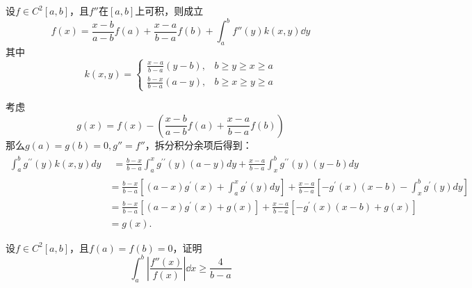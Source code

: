 \begin{theorem}[拉格朗日插值积分余项]
设$f\in C^2[a,b]$，且$f''$在$[a,b]$上可积，则成立
\[f(x)=\frac{x-b}{a-b}f(a)+\frac{x-a}{b-a}f(b)+\int_a^bf''(y)k(x,y)\dd y\]
其中\[k(x,y)=\begin{cases}\frac{x-a}{b-a}(y-b),&b\geqslant y\geqslant x\geqslant a\\\frac{b-x}{b-a}(a-y),&b\geqslant x\geqslant y\geqslant a\end{cases}\]
\end{theorem}
考虑\[g(x)=f(x)-\left(\frac{x-b}{a-b}f(a)+\frac{x-a}{b-a}f(b)\right)\]
那么$g(a)=g(b)=0,g''=f''$，拆分积分余项后得到：
\begin{align*}\int_a^bg^{\prime\prime}\left(y\right)k\left(x,y\right)dy&\begin{aligned}=\frac{b-x}{b-a}\int_{a}^{x}g^{\prime\prime}\left(y\right)\left(a-y\right)dy+\frac{x-a}{b-a}\int_{x}^{b}g^{\prime\prime}\left(y\right)\left(y-b\right)dy\end{aligned}\\&=\frac{b-x}{b-a}\left[\left(a-x\right)g^{\prime}\left(x\right)+\int_{a}^{x}g^{\prime}\left(y\right)dy\right]+\frac{x-a}{b-a}\left[-g^{\prime}\left(x\right)\left(x-b\right)-\int_{x}^{b}g^{\prime}\left(y\right)dy\right]\\&=\frac{b-x}{b-a}\left[\left(a-x\right)g^{\prime}\left(x\right)+g\left(x\right)\right]+\frac{x-a}{b-a}\left[-g^{\prime}\left(x\right)\left(x-b\right)+g\left(x\right)\right]\\&=g\left(x\right).\end{align*}
\newpage
\begin{example}
    设$f\in C^2[a,b]$，且$f(a)=f(b)=0$，证明\[\int_a^b\left|\frac{f''(x)}{f(x)}\right|\dd x\geqslant \frac{4}{b-a}\]
\end{example}
